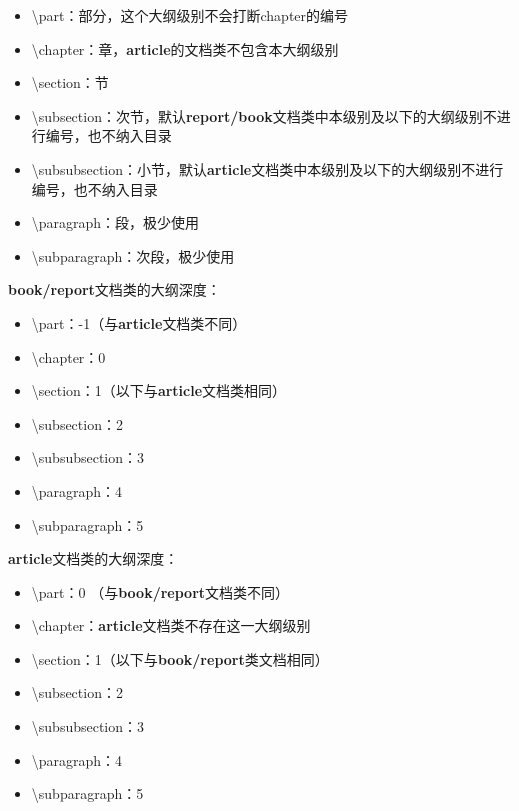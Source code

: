 \documentclass{ctexart}
\begin{document}
            \begin{itemize}
                \item \textbackslash part：部分，这个大纲级别不会打断chapter的编号
                \item \textbackslash chapter：章，\textbf{article}的文档类不包含本大纲级别
                \item \textbackslash section：节
                \item \textbackslash subsection：次节，默认\textbf{report/book}文档类中本级别及以下的大纲级别不进行编号，也不纳入目录
                \item \textbackslash subsubsection：小节，默认\textbf{article}文档类中本级别及以下的大纲级别不进行编号，也不纳入目录
                \item \textbackslash paragraph：段，极少使用
                \item \textbackslash subparagraph：次段，极少使用
            \end{itemize}

            \textbf{book/report}文档类的大纲深度：

            \begin{itemize}
                \item \textbackslash part：-1（与\textbf{article}文档类不同）
                \item \textbackslash chapter：0
                \item \textbackslash section：1（以下与\textbf{article}文档类相同）
                \item \textbackslash subsection：2
                \item \textbackslash subsubsection：3
                \item \textbackslash paragraph：4
                \item \textbackslash subparagraph：5
            \end{itemize}

            \textbf{article}文档类的大纲深度：

            \begin{itemize}
                \item \textbackslash part：0 （与\textbf{book/report}文档类不同）
                \item \textbackslash chapter：\textbf{article}文档类不存在这一大纲级别
                \item \textbackslash section：1（以下与\textbf{book/report}类文档相同）
                \item \textbackslash subsection：2
                \item \textbackslash subsubsection：3
                \item \textbackslash paragraph：4
                \item \textbackslash subparagraph：5
            \end{itemize}
\end{document}
